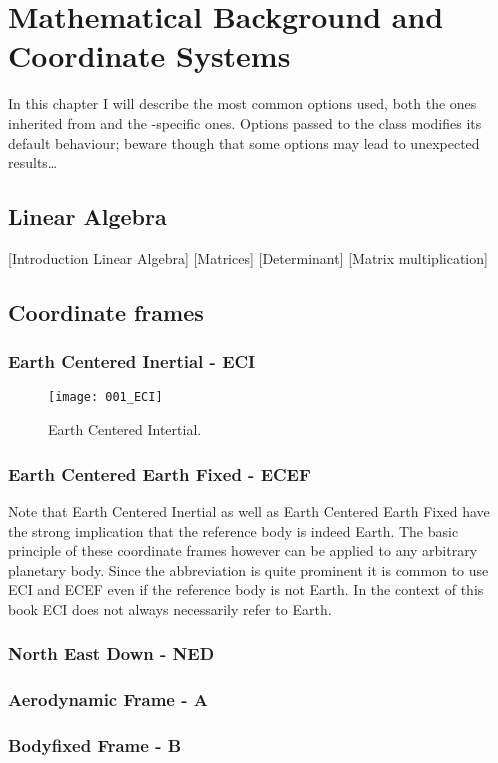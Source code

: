 \setchapterpreamble[u]{\margintoc}
\chapter{Mathematical Background and Coordinate Systems}

In this chapter I will describe the most common options used, both the 
ones inherited from  and the -specific ones. 
Options passed to the class modifies its default behaviour; beware 
though that some options may lead to unexpected results\ldots

\section{Linear Algebra}

[Introduction Linear Algebra]
[Matrices]
[Determinant]
[Matrix multiplication]

\section{Coordinate frames }

\subsection{Earth Centered Inertial - ECI}

\begin{figure}[hb]
	\texttt{[image: 001\_ECI]}
	\caption[Earth Centered Intertial]{Earth Centered Intertial. }
\end{figure}

\subsection{Earth Centered Earth Fixed - ECEF}

\begin{kaobox}[frametitle=Reference Body]
	Note that Earth Centered Inertial as well as Earth Centered Earth Fixed have the strong implication that the reference body is indeed Earth. The basic principle of these coordinate frames however can be applied to any arbitrary planetary body. Since the abbreviation is quite prominent it is common to use ECI and ECEF even if the reference body is not Earth. In the context of this book ECI does not always necessarily refer to Earth.
\end{kaobox}

\subsection{North East Down - NED}
\subsection{Aerodynamic Frame - A}
\subsection{Bodyfixed Frame - B}


